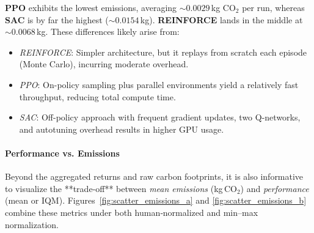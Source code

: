\noindent
\textbf{PPO} exhibits the lowest emissions, averaging $\sim0.0029$\,kg CO$_2$ per run, whereas \textbf{SAC} is by far the highest ($\sim0.0154$\,kg). \textbf{REINFORCE} lands in the middle at $\sim0.0068$\,kg. These differences likely arise from:
\begin{itemize}
	\item \emph{REINFORCE}: Simpler architecture, but it replays from scratch each episode (Monte Carlo), incurring moderate overhead.  
	\item \emph{PPO}: On-policy sampling plus parallel environments yield a relatively fast throughput, reducing total compute time.  
	\item \emph{SAC}: Off-policy approach with frequent gradient updates, two Q-networks, and autotuning overhead results in higher GPU usage.
\end{itemize}



\paragraph{Performance vs. Emissions}
Beyond the aggregated returns and raw carbon footprints, it is also informative to visualize the **trade‐off** between \emph{mean emissions} (kg\,CO$_2$) and \emph{performance} (mean or IQM). Figures~\ref{fig:scatter_emissions_a} and \ref{fig:scatter_emissions_b} combine these metrics under both human‐normalized and min–max normalization.

